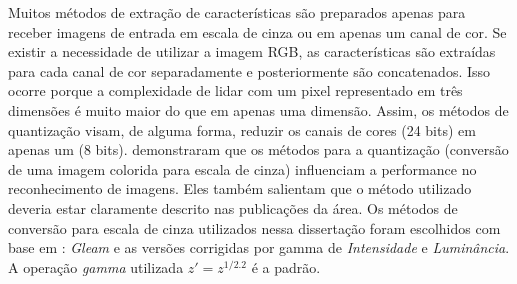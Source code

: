 Muitos métodos de extração de características são preparados apenas para receber imagens de entrada em escala de cinza ou em apenas um canal de cor. Se existir a necessidade de utilizar a imagem RGB, as características são extraídas para cada canal de cor separadamente e posteriormente são concatenados. Isso ocorre porque a complexidade de lidar com um pixel representado em três dimensões é muito maior do que em apenas uma dimensão. Assim, os métodos de quantização visam, de alguma forma, reduzir os canais de cores (24 bits) em apenas um (8 bits).  demonstraram que os métodos para a quantização (conversão de uma imagem colorida para escala de cinza) influenciam a performance no reconhecimento de imagens. Eles também salientam que o método utilizado deveria estar claramente descrito nas publicações da área. Os métodos de conversão para escala de cinza utilizados nessa dissertação foram escolhidos com base em : \emph{Gleam} e as versões corrigidas por gamma de \emph{Intensidade} e \emph{Luminância}. A operação \textit{gamma} utilizada $z' = z^{1/2.2}$ é a padrão.

